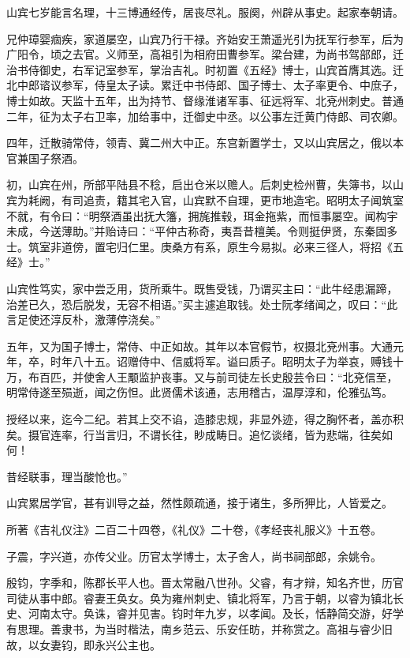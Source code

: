\documentclass[12pt,UTF8]{ctexbook}
\begin{document}
山宾七岁能言名理，十三博通经传，居丧尽礼。服阕，州辟从事史。起家奉朝请。

兄仲璋婴痼疾，家道屡空，山宾乃行干禄。齐始安王萧遥光引为抚军行参军，后为广阳令，顷之去官。义师至，高祖引为相府田曹参军。梁台建，为尚书驾部郎，迁治书侍御史，右军记室参军，掌治吉礼。时初置《五经》博士，山宾首膺其选。迁北中郎谘议参军，侍皇太子读。累迁中书侍郎、国子博士、太子率更令、中庶子，博士如故。天监十五年，出为持节、督缘淮诸军事、征远将军、北兗州刺史。普通二年，征为太子右卫率，加给事中，迁御史中丞。以公事左迁黄门侍郎、司农卿。

四年，迁散骑常侍，领青、冀二州大中正。东宫新置学士，又以山宾居之，俄以本官兼国子祭酒。

初，山宾在州，所部平陆县不稔，启出仓米以赡人。后刺史检州曹，失簿书，以山宾为耗阙，有司追责，籍其宅入官，山宾默不自理，更市地造宅。昭明太子闻筑室不就，有令曰：“明祭酒虽出抚大籓，拥旄推毂，珥金拖紫，而恒事屡空。闻构宇未成，今送薄助。”并贻诗曰：“平仲古称奇，夷吾昔檀美。令则挺伊贤，东秦固多士。筑室非道傍，置宅归仁里。庚桑方有系，原生今易拟。必来三径人，将招《五经》士。”

山宾性笃实，家中尝乏用，货所乘牛。既售受钱，乃谓买主曰：“此牛经患漏蹄，治差已久，恐后脱发，无容不相语。”买主遽追取钱。处士阮孝绪闻之，叹曰：“此言足使还淳反朴，激薄停浇矣。”

五年，又为国子博士，常侍、中正如故。其年以本官假节，权摄北兗州事。大通元年，卒，时年八十五。诏赠侍中、信威将军。谥曰质子。昭明太子为举哀，赙钱十万，布百匹，并使舍人王颙监护丧事。又与前司徒左长史殷芸令曰：“北兗信至，明常侍遂至殒逝，闻之伤怛。此贤儒术该通，志用稽古，温厚淳和，伦雅弘笃。

授经以来，迄今二纪。若其上交不谄，造膝忠规，非显外迹，得之胸怀者，盖亦积矣。摄官连率，行当言归，不谓长往，眇成畴日。追忆谈绪，皆为悲端，往矣如何！

昔经联事，理当酸怆也。”

山宾累居学官，甚有训导之益，然性颇疏通，接于诸生，多所狎比，人皆爱之。

所著《吉礼仪注》二百二十四卷，《礼仪》二十卷，《孝经丧礼服义》十五卷。

子震，字兴道，亦传父业。历官太学博士，太子舍人，尚书祠部郎，余姚令。

殷钧，字季和，陈郡长平人也。晋太常融八世孙。父睿，有才辩，知名齐世，历官司徒从事中郎。睿妻王奂女。奂为雍州刺史、镇北将军，乃言于朝，以睿为镇北长史、河南太守。奂诛，睿并见害。钧时年九岁，以孝闻。及长，恬静简交游，好学有思理。善隶书，为当时楷法，南乡范云、乐安任昉，并称赏之。高祖与睿少旧故，以女妻钧，即永兴公主也。
\end{document}
